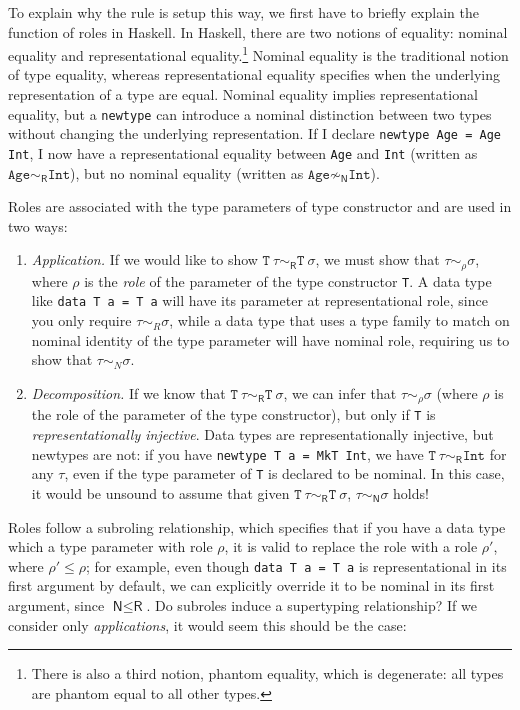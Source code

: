 To explain why the rule is setup this way, we first have to briefly
explain
the function of roles in Haskell.  In Haskell, there are two notions of
equality: nominal equality and representational equality.\footnote{There is also
a third notion, phantom equality, which is degenerate: all types are phantom
equal to all other types.}  Nominal
equality is the traditional notion of type equality, whereas
representational equality specifies when the underlying representation
of a type are equal.  Nominal equality implies representational
equality, but a \verb|newtype| can introduce a nominal distinction between
two types without changing the underlying representation. If I declare
\verb|newtype Age = Age Int|, I now have a representational equality
between \verb|Age| and \verb|Int| (written as $\texttt{Age}
\sim_\textsf{R} \texttt{Int}$), but no nominal equality (written as $\texttt{Age}
\not\sim_\textsf{N} \texttt{Int}$).

Roles are associated with the type parameters of type constructor and
are used in two ways:

\begin{enumerate}
    \item \emph{Application.} If we would like to show $\texttt{T}~\tau \sim_\textsf{R}
    \texttt{T}~\sigma$, we must show that $\tau \sim_\rho \sigma$, where
    $\rho$ is the \emph{role} of the parameter of the type constructor
    \verb|T|.  A data type like \verb|data T a = T a| will have its parameter
    at representational role, since you only require $\tau \sim_R
    \sigma$, while a data type that uses a type family to match on
    nominal identity of the type parameter will have nominal role,
    requiring us to show that $\tau \sim_N \sigma$.

    \item \emph{Decomposition.}  If we know that $\texttt{T}~\tau \sim_\textsf{R}
    \texttt{T}~\sigma$, we can infer that $\tau \sim_\rho \sigma$ (where $\rho$
    is the role of the parameter of the type constructor),
    but only if \verb|T| is \emph{representationally injective}.  Data types
    are representationally injective, but newtypes are not: if you
    have \verb|newtype T a = MkT Int|,
    we have $\texttt{T}~\tau \sim_\textsf{R} \texttt{Int}$ for any $\tau$,
    even if the type parameter of \verb|T| is declared
    to be nominal.  In this case,
    it would be unsound to assume that given
    $\texttt{T}~\tau \sim_\textsf{R} \texttt{T}~\sigma$, $\tau \sim_\textsf{N} \sigma$ holds!
\end{enumerate}
%
Roles follow a subroling relationship, which specifies that if you have
a data type which a type parameter with role $\rho$, it is valid to
replace the role with a role $\rho'$, where $\rho' \le \rho$; for example,
even though \verb|data T a = T a| is representational in its first
argument by default, we can explicitly override it to be nominal in its
first argument, since $\textsf{N} \le \textsf{R}$.  Do subroles induce
a supertyping relationship?  If we consider only \emph{applications}, it would
seem this should be the case:

